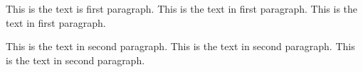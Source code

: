 \documentclass{article}
\begin{document}
   This is the text is first paragraph. This is the text in first paragraph. This is the text in first paragraph. \par This is the text in second paragraph. This is the text in second paragraph. This is the text in second paragraph.
   
   
\end{document}

